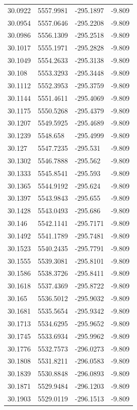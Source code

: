 \begin{table}[H]
\begin{tabular}{llll}
30.0922 & 5557.9981 & -295.1897 & -9.809 \\
30.0954 & 5557.0646 & -295.2208 & -9.809 \\
30.0986 & 5556.1309 & -295.2518 & -9.809 \\
30.1017 & 5555.1971 & -295.2828 & -9.809 \\
30.1049 & 5554.2633 & -295.3138 & -9.809 \\
30.108 & 5553.3293 & -295.3448 & -9.809 \\
30.1112 & 5552.3953 & -295.3759 & -9.809 \\
30.1144 & 5551.4611 & -295.4069 & -9.809 \\
30.1175 & 5550.5268 & -295.4379 & -9.809 \\
30.1207 & 5549.5925 & -295.4689 & -9.809 \\
30.1239 & 5548.658 & -295.4999 & -9.809 \\
30.127 & 5547.7235 & -295.531 & -9.809 \\
30.1302 & 5546.7888 & -295.562 & -9.809 \\
30.1333 & 5545.8541 & -295.593 & -9.809 \\
30.1365 & 5544.9192 & -295.624 & -9.809 \\
30.1397 & 5543.9843 & -295.655 & -9.809 \\
30.1428 & 5543.0493 & -295.686 & -9.809 \\
30.146 & 5542.1141 & -295.7171 & -9.809 \\
30.1492 & 5541.1789 & -295.7481 & -9.809 \\
30.1523 & 5540.2435 & -295.7791 & -9.809 \\
30.1555 & 5539.3081 & -295.8101 & -9.809 \\
30.1586 & 5538.3726 & -295.8411 & -9.809 \\
30.1618 & 5537.4369 & -295.8722 & -9.809 \\
30.165 & 5536.5012 & -295.9032 & -9.809 \\
30.1681 & 5535.5654 & -295.9342 & -9.809 \\
30.1713 & 5534.6295 & -295.9652 & -9.809 \\
30.1745 & 5533.6934 & -295.9962 & -9.809 \\
30.1776 & 5532.7573 & -296.0273 & -9.809 \\
30.1808 & 5531.8211 & -296.0583 & -9.809 \\
30.1839 & 5530.8848 & -296.0893 & -9.809 \\
30.1871 & 5529.9484 & -296.1203 & -9.809 \\
30.1903 & 5529.0119 & -296.1513 & -9.809 \\

\end{tabular}
\end{table}
